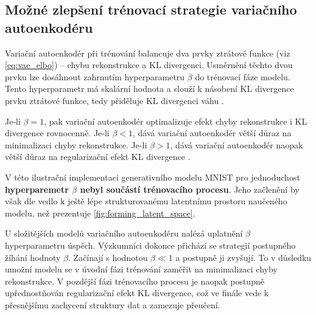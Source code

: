 \subsection{Možné zlepšení trénovací strategie variačního autoenkodéru}
Variační autoenkodér při trénování balancuje dva prvky ztrátové funkce (viz \autoref{eq:vae_elbo}) – chybu rekonstrukce a KL divergenci.
Usměrnění těchto dvou prvku lze dosáhnout zahrnutím hyperparametru $\beta$ do trénovací fáze modelu. 
Tento hyperparametr má skalární hodnota a slouží k násobení KL divergence prvku ztrátové funkce, tedy přiděluje KL divergenci váhu \cite{Higgins2022}.

Je-li $\beta = 1$, pak variační autoenkodér optimalizuje efekt chyby rekonstrukce i KL divergence rovnocenně.   
Je-li $\beta < 1$, dává variační autoenkodér větší důraz na minimalizaci chyby rekonstrukce.
Je-li $\beta > 1$, dává variační autoenkodér naopak větší důraz na regularizační efekt KL divergence \cite{Higgins2022}.

V této ilustrační implementaci generativního modelu MNIST pro jednoduchost \textbf{hyperparemetr $\beta$ nebyl součástí trénovacího procesu}.
Jeho začlenění by však dle \textcite{Higgins2022} vedlo k ještě lépe strukturovanému latentnímu prostoru naučeného modelu, než prezentuje \autoref{fig:forming_latent_space}.

U složitějších modelů variačního autoenkodéru nalézá uplatnění $\beta$ hyperparametru úspěch.
Výzkumníci \textcite{Sankarapandian2021} dokonce přichází se strategií postupného žíhání hodnoty $\beta$.
Začínají s hodnotou $\beta \ll 1$ a postupně ji zvyšují.
To v důsledku umožní modelu se v úvodní fázi trénování zaměřit na minimalizaci chyby rekonstrukce.
V pozdější fázi trénovacího procesu je naopak postupně upřednostňován regularizační efekt KL divergence, což ve finále vede k přesnějšímu zachycení struktury dat a zamezuje přeučení.

